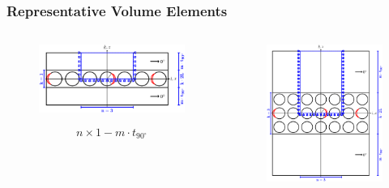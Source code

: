 \documentclass[first,firstsupp,lastsupp,last,hyperref,table]{ETHclass}
\begin{document}
\begin{frame}
\frametitle{\vspace{0.2cm}\small Representative Volume Elements}
\vspace{-1cm}
\centering
\begin{columns}[c]
\begin{column}{0.55\textwidth}
\centering
\begin{figure}
\centering
\includegraphics[width=\columnwidth]{thinPly.pdf}
\end{figure}
\vspace{-0.25cm}
\begin{equation*}
n\times 1-m\cdot t_{90^{\circ}}
\end{equation*}
\end{column}
\begin{column}{0.45\textwidth}
\centering
\begin{figure}
\centering
\includegraphics[width=\columnwidth]{ThickPly.pdf}

\end{figure}
\end{column}
\end{columns}
\end{frame}
\end{document}
